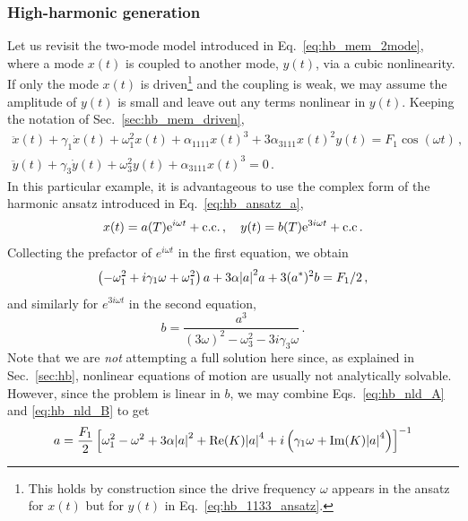 \subsubsection{High-harmonic generation}

Let us revisit the two-mode model introduced in Eq.~\eqref{eq:hb_mem_2mode}, where a mode $x(t)$ is coupled to another mode, $y(t)$, via a cubic nonlinearity. If only the mode $x(t)$ is driven\footnote{This holds by construction since the drive frequency $\omega$ appears in the ansatz for $x(t)$ but for $y(t)$ in Eq.~\eqref{eq:hb_1133_ansatz}.} and the coupling is weak, we may assume the amplitude of $y(t)$ is small and leave out any terms nonlinear in $y(t)$. Keeping the notation of Sec.~\ref{sec:hb_mem_driven}, 
\begin{equation} \label{eq:hb_nld_eom}
\begin{gathered}
\ddot{x}(t) + \gamma_1 \dot{x}(t) + \omega_1^2 x(t) + \alpha_{1111} x(t)^3 +  3 \alpha_{3111} x(t)^2 y(t) = F_1 \cos(\omega t) \,, \\
\ddot{y}(t) + \gamma_3 \dot{y}(t) + \omega_3^2 y(t) + \alpha_{3111} x(t)^3 = 0 \,.
\end{gathered}
\end{equation}
In this particular example, it is advantageous to use the complex form of the harmonic ansatz introduced in Eq.~\eqref{eq:hb_ansatz_a},
\begin{equation}
x(t) = a(T) {\rm e}^{i \omega t} + \text{c.c.} \,, \quad y(t) = b(T) {\rm e}^{3 i \omega t}  + \text{c.c} \,.
\end{equation}
Collecting the prefactor of  $e^{i \omega t}$ in the first equation, we obtain
\begin{equation} \label{eq:hb_nld_A}
\left(- \omega_1^2 + i \gamma_1 \omega + \omega_1^2\right) a + 3\alpha \abs{a}^2a + 3 (a^*)^2 b = F_1/2 \,,
\end{equation}
and similarly for $e^{3 i \omega t}$ in the second equation, 
\begin{equation} \label{eq:hb_nld_B}
b = \frac{a^3}{(3\omega)^2 - \omega_3^2 - 3 i \gamma_3 \omega} \,.
\end{equation}
Note that we are \textit{not} attempting a full solution here since, as explained in Sec.~\ref{sec:hb}, nonlinear equations of motion are usually not analytically solvable. However, since the problem is linear in $b$, we may combine Eqs.~\eqref{eq:hb_nld_A} and \eqref{eq:hb_nld_B} to get
\begin{equation} \label{eq:hb_nld_selfcons}
a = \frac{F_1}{2} \left[\omega_1^2 - \omega^2 + 3 \alpha \abs{a}^2 + \text{Re} (K) \abs{a}^4  + i \left( \gamma_1 \omega +  \text{Im} (K) \abs{a}^4 \right)\right]^{-1}
\end{equation}
